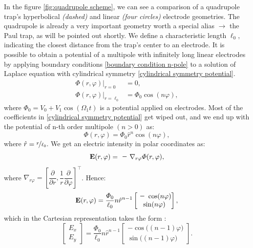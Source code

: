 In the figure \ref{fig:quadrupole scheme}, we can see a comparison of a quadrupole trap's hyperbolical \textit{(dashed)} and linear \textit{(four circles)} electrode geometries. The quadrupole is already a very important geometry worth a special alias $\rightarrow$ the Paul trap, as will be pointed out shortly. We define a characteristic length $\ell_0$, indicating the closest distance from the trap's center to an electrode. It is possible to obtain a potential of a multipole with infinitely long linear electrodes by applying boundary conditions \eqref{boundary condition n-pole} to a solution of Laplace equation with cylindrical symmetry \eqref{cylindrical symmetry potential}.
\begin{subequations}
\label{boundary condition n-pole}
\begin{align}
	\Phi(r,\varphi)\vert_{r=0}&=0, \\
	\Phi(r,\varphi)\vert_{r=\ell_0}&=\Phi_0 \cos(n\varphi),
\end{align}
\end{subequations}
where $\Phi_0 = V_0 + V_1 \cos(\Omega_1 t)$ is a potential applied on electrodes. Most of the coefficients in \eqref{cylindrical symmetry potential} get wiped out, and we end up with the potential of n-th order multipole $(n > 0)$ as:
\begin{equation}
	\label{potential n-pole}
	\Phi(r,\varphi) = \Phi_0 \hat{r}^n \cos(n\varphi),	
\end{equation}
where $\hat{r} = \nicefrac{r}{\ell_0}$. We get an electric intensity in polar coordinates as: 
\begin{equation}
	\vb{E}(r,\varphi) = \minus\nabla_{r\varphi} \Phi(r,\varphi),
\end{equation}
where $\nabla_{r\varphi} = \left[\dfrac{\partial}{\partial r}, \dfrac{1}{r} \dfrac{\partial}{\partial \varphi}\right]^\top$. Hence:
\begin{equation}
\label{need this for norm(E_0)}
\vb{E}(r,\varphi) = \dfrac{\Phi_0}{\ell_0} n \hat{r}^{n-1} 
\begin{bmatrix}
	\minus\cos(n\varphi) \\
	\sin(n\varphi)
\end{bmatrix},
\end{equation}
which in the Cartesian representation takes the form \cite{gerlich1992inhomogeneous}:
\begin{equation}
\begin{bmatrix}
	E_x \\
	E_y
\end{bmatrix}
 = \dfrac{\Phi_0}{\ell_0} n \hat{r}^{n-1} 
\begin{bmatrix}
	\minus\cos\big((n \minus 1)\varphi\big) \\
	\sin\big((n \minus 1)\varphi\big)
\end{bmatrix}.
\end{equation}
